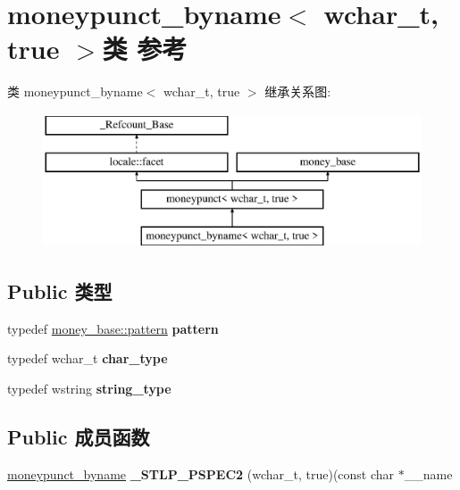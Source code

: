 \hypertarget{classmoneypunct__byname_3_01wchar__t_00_01true_01_4}{}\section{moneypunct\+\_\+byname$<$ wchar\+\_\+t, true $>$类 参考}
\label{classmoneypunct__byname_3_01wchar__t_00_01true_01_4}
类 moneypunct\+\_\+byname$<$ wchar\+\_\+t, true $>$ 继承关系图\+:\begin{figure}[H]
\begin{center}
\leavevmode
\includegraphics[height=4.000000cm]{classmoneypunct__byname_3_01wchar__t_00_01true_01_4}
\end{center}
\end{figure}
\subsection*{Public 类型}
\begin{DoxyCompactItemize}
\item 
\mbox{\label{classmoneypunct__byname_3_01wchar__t_00_01true_01_4_a6baef012b0e2de4a909e86ee36831be8}} 
typedef \hyperlink{structmoney__base_1_1pattern}{money\+\_\+base\+::pattern} {\bfseries pattern}
\item 
\mbox{\label{classmoneypunct__byname_3_01wchar__t_00_01true_01_4_a842d39da36fba81b8891309450673b52}} 
typedef wchar\+\_\+t {\bfseries char\+\_\+type}
\item 
\mbox{\label{classmoneypunct__byname_3_01wchar__t_00_01true_01_4_a31249bfbcca7ac6b9d305bf746da38b4}} 
typedef wstring {\bfseries string\+\_\+type}
\end{DoxyCompactItemize}
\subsection*{Public 成员函数}
\begin{DoxyCompactItemize}
\item 
\mbox{\label{classmoneypunct__byname_3_01wchar__t_00_01true_01_4_ad5f38562bb0487687be9f60199b665bf}} 
\hyperlink{classmoneypunct__byname}{moneypunct\+\_\+byname} {\bfseries \+\_\+\+S\+T\+L\+P\+\_\+\+P\+S\+P\+E\+C2} (wchar\+\_\+t, true)(const char $\ast$\+\_\+\+\_\+name
\end{DoxyCompactItemize}
